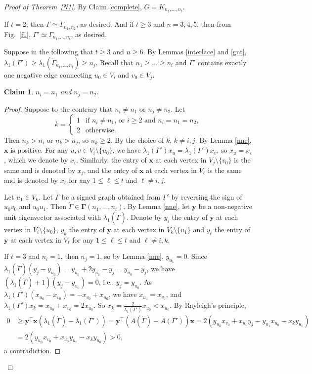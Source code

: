 \documentclass[10pt,a4paper]{amsart}
\numberwithin{equation}{section}
\newtheorem {Claim} {Claim}[section]
\begin{document}
\begin{proof}[Proof of Theorem~\ref{N1}]
  
By Claim \ref{complete}, $G=K_{n_1, \dots, n_t}$. 

If $t=2$, then $\Gamma\simeq \Gamma_{n_1, n_2}$, as desired. And if $t\ge 3$ and $n=3,4,5$, then from Fig.~\ref{f1}, $\Gamma'\simeq \Gamma_{n_1, \dots, n_t}$, as desired. 

Suppose in the following that $t\ge 3$ and $n\ge 6$. 
By Lemmas \ref{interlace} and \ref{gnt}, $\lambda_1(\Gamma')\ge\lambda_1(\dot\Gamma_{n_1, \dots, n_t})\ge n_j$. Recall that $n_1\ge \dots\ge n_t$ and $\Gamma'$ contains exactly one negative edge connecting  $u_0\in V_i$ and $v_0\in V_j$.

\begin{Claim}\label{large}
$n_i=n_1$ and $n_j=n_2$.  
\end{Claim}


\begin{proof}
Suppose to the contrary that $n_i\ne n_1$ or $n_j\ne n_2$.
Let 
\[
k=\begin{cases}
1 &  \mbox{if $n_i\ne n_1$, or $i\ge 2$ and $n_i=n_1=n_2$},\\
2 &  \mbox{otherwise}.
\end{cases}
\]
Then $n_k> n_i$ or $n_k> n_j$, so $n_k\ge 2$. By the choice of $k$, $k\ne i,j$. 
By Lemma \ref{nne}, $\mathbf{x}$ is positive. 
For any $u, v\in V_i\setminus \{u_0\}$, we have  $\lambda_1(\Gamma')x_u=\lambda_1(\Gamma')x_v$, so $x_u=x_v$, which we denote by $x_i$. 
Similarly, the entry of $\mathbf{x}$ at each vertex in $V_j\setminus\{v_0\}$ is the same and is denoted by $x_j$,  and  the entry of $\mathbf{x}$ at each vertex in $V_\ell$ is the same and is denoted by $x_\ell$
for any $1\le \ell \le t$ and $\ell\ne i, j$. 

Let $u_1\in V_k$.  
Let $\dot{\Gamma}$ be a signed graph obtained from $\Gamma'$ by reversing the sign of $u_0v_0$ and $u_0u_1$. Then $\dot{\Gamma}\in \boldsymbol\Gamma(n_1,\dots, n_t)$. By Lemma \ref{nne}, let $\mathbf{y}$ be a non-negative unit eigenvector associated with $\lambda_1(\dot{\Gamma})$. Denote by $y_i$ the entry of $\mathbf{y}$ at each vertex in $V_i\setminus\{u_0\}$, $y_k$ the entry of $\mathbf{y}$ at each vertex in $V_k\setminus\{u_1\}$ and $y_\ell$ the entry of $\mathbf{y}$ at each vertex in $V_\ell$ for any $1\le \ell \le t$ and $\ell\ne i, k$. 

If $t=3$ and $n_i=1$, then $n_j=1$, so by Lemma \ref{nne}, $y_{u_1}=0$. Since $\lambda_1(\dot{\Gamma})(y_j-y_{u_0})=y_{u_0}+2y_{u_1}-y_j=y_{u_0}-y_j$, we have $(\lambda_1(\dot{\Gamma})+1)(y_j-y_{u_0})=0$, i.e., $y_j=y_{u_0}$. 
As $\lambda_1(\Gamma')(x_{u_0}-x_{v_0})=-x_{v_0}+x_{u_0}$, we have $x_{u_0}=x_{v_0}$, and $\lambda_1(\Gamma')x_k=x_{u_0}+x_{v_0}=2x_{u_0}$. 
So $x_k=\frac{2}{\lambda_1(\Gamma')}x_{u_0}<x_{u_0}$. 
By Rayleigh's principle, 
\begin{align*}
0& \ge \mathbf{y}^\top\mathbf{x}(\lambda_1(\dot{\Gamma})-\lambda_1(\Gamma'))= \mathbf{y}^\top\left(A(\dot{\Gamma})-A(\Gamma')\right)\mathbf{x}=2\left(y_{u_0}x_{v_0}+x_{u_0}y_j-y_{u_1}x_{u_0}-x_ky_{u_0}\right)\\
& =2\left(y_{u_0}x_{v_0}+x_{u_0}y_{u_0}-x_ky_{u_0}\right)>0, 
\end{align*}
a contradiction.


\end{proof}
\end{proof}
\end{document}
